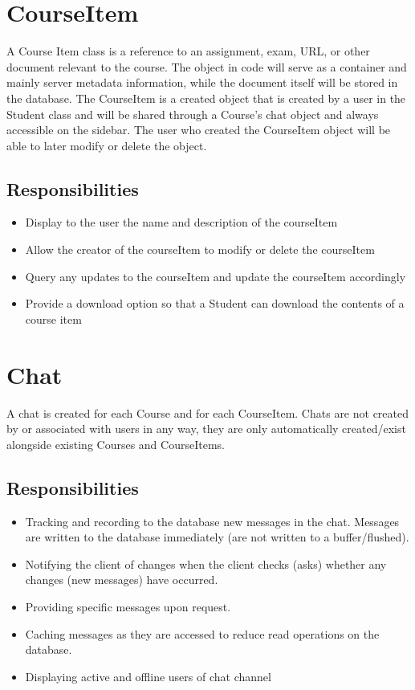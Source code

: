 \documentclass[16pt]{scrreprt}
\begin{document}
\section{CourseItem}
A Course Item class is a reference to an assignment, exam, URL, or other document relevant to the course. The object in code will serve as a container and mainly server metadata information, while the document itself will be stored in the database. The CourseItem is a created object that is created by a user in the Student class and will be shared through a Course’s chat object and always accessible on the sidebar. The user who created the CourseItem object will be able to later modify or delete the object.
\subsection{Responsibilities}
\begin{itemize}
	\item Display to the user the name and description of the courseItem
	\item Allow the creator of the courseItem to modify or delete the courseItem
	\item Query any updates to the courseItem and update the courseItem accordingly
	\item Provide a download option so that a Student can download the contents of a course item
\end{itemize}

\section{Chat}
A chat is created for each Course and for each CourseItem. Chats are not created by or associated with users in any way, they are only automatically created/exist alongside existing Courses and CourseItems.
\subsection{Responsibilities}
\begin{itemize}
	\item Tracking and recording to the database new messages in the chat. Messages are written to the database immediately (are not written to a buffer/flushed).
	\item Notifying the client of changes when the client checks (asks) whether any changes (new messages) have occurred.
	\item Providing specific messages upon request.
	\item Caching messages as they are accessed to reduce read operations on the database.
	\item Displaying active and offline users of chat channel
\end{itemize}
\end{document}
